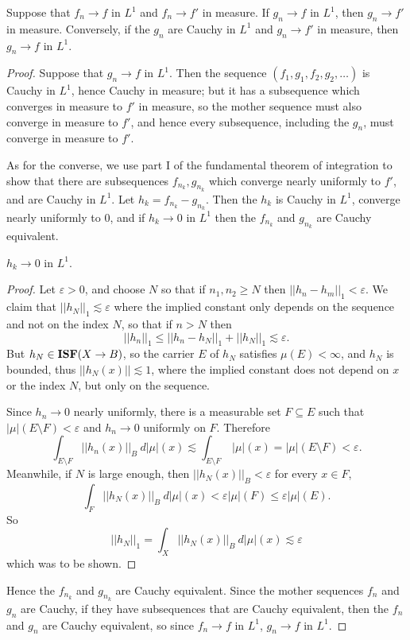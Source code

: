 \begin{theorem}
Suppose that $f_n \to f$ in $L^1$ and $f_n \to f'$ in measure.
If $g_n \to f$ in $L^1$, then $g_n \to f'$ in measure.
Conversely, if the $g_n$ are Cauchy in $L^1$ and $g_n \to f'$ in measure, then $g_n \to f$ in $L^1$.
\end{theorem}
\begin{proof}
Suppose that $g_n \to f$ in $L^1$.
Then the sequence $(f_1, g_1, f_2, g_2, \dots)$ is Cauchy in $L^1$, hence Cauchy in measure; but it has a subsequence which converges in measure to $f'$ in measure, so the mother sequence must also converge in measure to $f'$, and hence every subsequence, including the $g_n$, must converge in measure to $f'$.

As for the converse, we use part I of the fundamental theorem of integration to show that there are subsequences $f_{n_k}, g_{n_k}$ which converge nearly uniformly to $f'$, and are Cauchy in $L^1$.
Let $h_k = f_{n_k} - g_{n_k}$. Then the $h_k$ is Cauchy in $L^1$, converge nearly uniformly to $0$, and if $h_k \to 0$ in $L^1$ then the $f_{n_k}$ and $g_{n_k}$ are Cauchy equivalent.
\begin{lemma}
$h_k \to 0$ in $L^1$.
\end{lemma}
\begin{proof}
Let $\varepsilon > 0$, and choose $N$ so that if $n_1, n_2 \geq N$ then $||h_n - h_m||_1 < \varepsilon$. We claim that $||h_N||_1 \lesssim \varepsilon$ where the implied constant only depends on the sequence and not on the index $N$, so that if $n > N$ then
\[||h_n||_1 \leq ||h_n - h_N||_1 + ||h_N||_1 \lesssim \varepsilon.\]
But $h_N \in \mathbf{ISF}(X \to B)$, so the carrier $E$ of $h_N$ satisfies $\mu(E) < \infty$, and $h_N$ is bounded, thus $||h_N(x)|| \lesssim 1$, where the implied constant does not depend on $x$ or the index $N$, but only on the sequence.

Since $h_n \to 0$ nearly uniformly, there is a measurable set $F \subseteq E$ such that $|\mu|(E \setminus F) < \varepsilon$ and $h_n \to 0$ uniformly on $F$. Therefore
\[\int_{E \setminus F} ||h_n(x)||_B ~d|\mu|(x) \lesssim \int_{E \setminus F} ~|\mu|(x) = |\mu|(E \setminus F) < \varepsilon.\]
Meanwhile, if $N$ is large enough, then $||h_N(x)||_B < \varepsilon$ for every $x \in F$,
\[\int_F ||h_N(x)||_B~d|\mu|(x) < \varepsilon |\mu|(F) \leq \varepsilon |\mu|(E).\]
So
\[||h_N||_1 = \int_X ||h_N(x)||_B ~d|\mu|(x) \lesssim \varepsilon\]
which was to be shown.
\end{proof}

Hence the $f_{n_k}$ and $g_{n_k}$ are Cauchy equivalent.
Since the mother sequences $f_n$ and $g_n$ are Cauchy, if they have subsequences that are Cauchy equivalent, then the $f_n$ and $g_n$ are Cauchy equivalent, so since $f_n \to f$ in $L^1$, $g_n \to f$ in $L^1$.
\end{proof}

